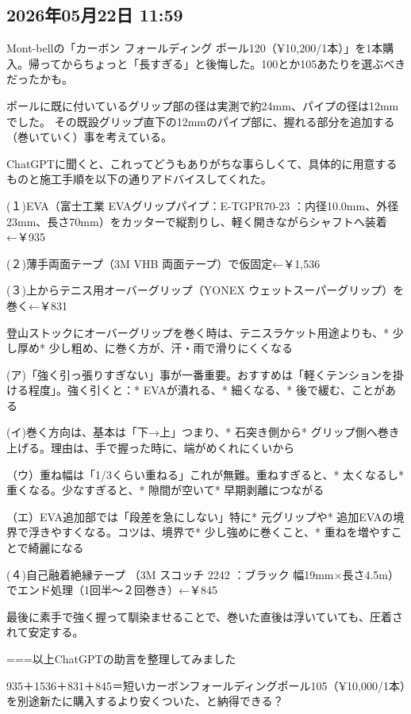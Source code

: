 \documentclass[facebook_diary.tex]{subfiles}
\begin{document}
\subsection*{2026年05月22日 11:59}

Mont-bellの「カーボン フォールディング ポール120（¥10,200/1本）」を1本購入。帰ってからちょっと「長すぎる」と後悔した。100とか105あたりを選ぶべきだったかも。


ポールに既に付いているグリップ部の径は実測で約24mm、パイプの径は12mmでした。 その既設グリップ直下の12mmのパイプ部に、握れる部分を追加する（巻いていく）事を考えている。

ChatGPTに聞くと、これってどうもありがちな事らしくて、具体的に用意するものと施工手順を以下の通りアドバイスしてくれた。


(１)EVA（富士工業 EVAグリップパイプ：E-TGPR70-23 ：内径10.0mm、外径23mm、長さ70mm）をカッターで縦割りし、軽く開きながらシャフトへ装着←￥935


(２)薄手両面テープ（3M VHB 両面テープ）で仮固定←￥1,536


(３)上からテニス用オーバーグリップ（YONEX ウェットスーパーグリップ）を巻く←￥831


登山ストックにオーバーグリップを巻く時は、テニスラケット用途よりも、* 少し厚め* 少し粗め、に巻く方が、汗・雨で滑りにくくなる

(ア)「強く引っ張りすぎない」事が一番重要。おすすめは「軽くテンションを掛ける程度」。強く引くと：* EVAが潰れる、* 細くなる、* 後で緩む、ことがある

(イ)巻く方向は、基本は「下→上」つまり、* 石突き側から* グリップ側へ巻き上げる。理由は、手で握った時に、端がめくれにくいから

（ウ）重ね幅は「1/3くらい重ねる」これが無難。重ねすぎると、* 太くなるし* 重くなる。少なすぎると、* 隙間が空いて* 早期剥離につながる

（エ）EVA追加部では「段差を急にしない」特に* 元グリップや* 追加EVAの境界で浮きやすくなる。コツは、境界で* 少し強めに巻くこと、* 重ねを増やすことで綺麗になる


(４)自己融着絶縁テープ （3M スコッチ 2242 ：ブラック 幅19mm×長さ4.5m）でエンド処理（1回半〜２回巻き）←￥845


最後に素手で強く握って馴染ませることで、巻いた直後は浮いていても、圧着されて安定する。


===以上ChatGPTの助言を整理してみました


935＋1536＋831＋845＝短いカーボンフォールディングポール105（¥10,000/1本）を別途新たに購入するより安くついた、と納得できる？
\end{document}

